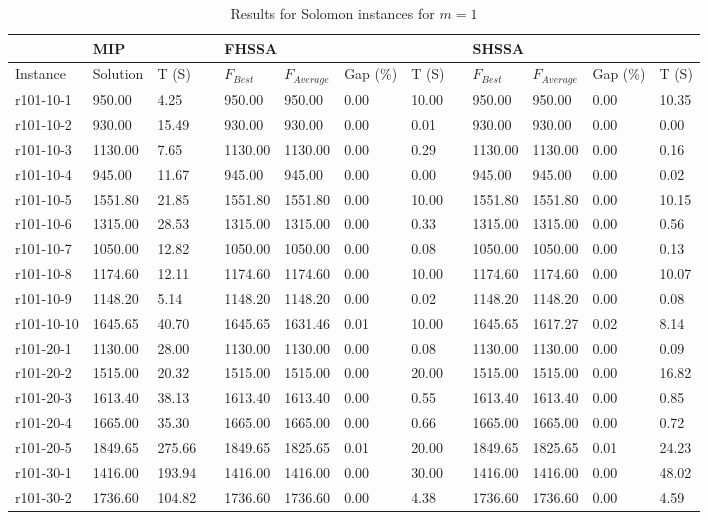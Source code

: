 \documentclass[final,5p,times,twocolumn]{elsarticle}
\begin{document}
{{{{{{{{{{{{{\renewcommand{\arraystretch}{1.2}
\begin{table*}[htbp]
\caption{Results for Solomon instances for $m=1$}
\centering
\begin{tabularx}{\linewidth}{m{4.5em} l l l l l l l l l l l l}
\hline
& \multicolumn{2}{l}{MIP}&&\multicolumn{4}{l}{FHSSA}&& \multicolumn{4}{l}{SHSSA}\\
\hline
Instance & Solution & T (S) & & $F_{Best}$ & $F_{Average}$  & Gap (\%) & T (S) & & $F_{Best}$ & $F_{Average}$  & Gap (\%) & T (S)\\
\hline
r101-10-1&950.00&4.25&&950.00&950.00&0.00&10.00&&950.00&950.00&0.00& 10.35\\
r101-10-2&930.00&15.49&&930.00&930.00&0.00&0.01&&930.00&930.00&0.00& 0.00\\
r101-10-3&1130.00&7.65&&1130.00&1130.00&0.00&0.29&&1130.00&1130.00& 0.00&0.16\\
r101-10-4&945.00&11.67&&945.00&945.00&0.00&0.00&&945.00&945.00&0.00& 0.02\\
r101-10-5&1551.80&21.85&&1551.80&1551.80&0.00&10.00&&1551.80&1551.80& 0.00&10.15\\
r101-10-6&1315.00&28.53&&1315.00&1315.00&0.00&0.33&&1315.00&1315.00& 0.00&0.56\\
r101-10-7&1050.00&12.82&&1050.00&1050.00&0.00&0.08&&1050.00&1050.00& 0.00&0.13\\
r101-10-8&1174.60&12.11&&1174.60&1174.60&0.00&10.00&&1174.60&1174.60& 0.00&10.07\\
r101-10-9&1148.20&5.14&&1148.20&1148.20&0.00&0.02&&1148.20&1148.20& 0.00&0.08\\
r101-10-10&1645.65&40.70&&1645.65&1631.46&0.01&10.00&&1645.65&1617.27& 0.02&8.14\\
r101-20-1&1130.00&28.00&&1130.00&1130.00&0.00&0.08&&1130.00&1130.00&0.00&0.09\\
r101-20-2&1515.00&20.32&&1515.00&1515.00&0.00&20.00&&1515.00&1515.00&0.00&16.82\\
r101-20-3&1613.40&38.13&&1613.40&1613.40&0.00&0.55&&1613.40&1613.40&0.00&0.85\\
r101-20-4&1665.00&35.30&&1665.00&1665.00&0.00&0.66&&1665.00&1665.00&0.00&0.72\\
r101-20-5&1849.65&275.66&&1849.65&1825.65&0.01&20.00&&1849.65&1825.65&0.01&24.23\\
r101-30-1&1416.00&193.94&&1416.00&1416.00&0.00&30.00&&1416.00&1416.00&0.00&48.02\\
r101-30-2&1736.60&104.82&&1736.60&1736.60&0.00&4.38&&1736.60&1736.60&0.00&4.59\\

\end{tabularx}
\end{table*}}}}}}}}}}}}}}
\end{document}
